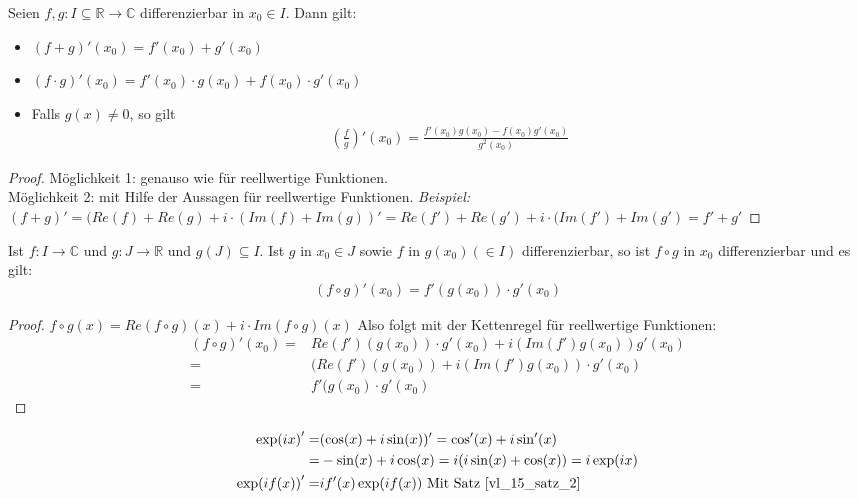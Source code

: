 \begin{Satz}{
	Seien $f,g : I \subseteq \mathbb{R} \rightarrow \mathbb{C}$ differenzierbar 
	in $x_0 \in I$. Dann gilt:
	\begin{itemize}
		\item $(f+g)'(x_0) = f'(x_0) + g'(x_0)$
		\item $(f\cdot g)'(x_0) = f'(x_0) \cdot g(x_0) + f(x_0) \cdot g'(x_0)$
		\item Falls $g(x) \neq 0$, so gilt
		\begin{align*}
			\left(\frac{f}{g}\right) '(x_0) = \frac{f'(x_0)g(x_0)-f(x_0)g'(x_0)}
			{g^2(x_0)}
		\end{align*}
	\end{itemize}
}\end{Satz}
\begin{proof}
	Möglichkeit 1: genauso wie für reellwertige Funktionen. \\
	Möglichkeit 2: mit Hilfe der Aussagen für reellwertige Funktionen.
	\textit{Beispiel: $(f+g)' = (Re(f)+Re(g) + i \cdot ( Im(f)+Im(g))' = Re(f') + 
	Re(g') + i \cdot (Im(f') + Im(g') = f' + g'$}
\end{proof}
\begin{Satz}{\label{vl_15_satz_2}
Ist $f : I \rightarrow \mathbb{C}$ und $g: J \rightarrow \mathbb{R}$ 
und $g(J) \subseteq I$. Ist $g$ in $x_0 \in J$ sowie $f$ in $g(x_0) (\in I)$ differenzierbar, so ist $f \circ g$ in $x_0$ differenzierbar und es gilt:
\begin{align*}
	(f\circ g)'(x_0) = f'(g(x_0)) \cdot g'(x_0)
\end{align*}
}\end{Satz}
\begin{proof}
	$f \circ g (x) = Re(f \circ g)(x) + i \cdot Im(f \circ g)(x)$
	Also folgt mit der Kettenregel für reellwertige Funktionen:
	\begin{align*}
		(f \circ g)'(x_0) = &  Re(f')(g(x_0))  \cdot g'(x_0) 
			+ i(Im(f')g(x_0)) g'(x_0) \\
			= & (Re(f')(g(x_0)) + i(Im(f')g(x_0)) \cdot g'(x_0) \\
			= & f'(g(x_0) \cdot g'(x_0)
	\end{align*}
\end{proof}

\begin{Beispiel}{
	\begin{align*}
		\exp(ix)' = & (\cos(x) + i\sin(x))' = \cos '(x) + i \sin ' (x) \\
		= & - \sin (x) + i \cos (x) 
		= i (i\sin (x) + \cos(x) ) = i \exp(ix) \\
		\exp(i f(x))' = & i f'(x) \exp(i f(x)) \text{ Mit Satz~\ref{vl_15_satz_2}}
	\end{align*}
}\end{Beispiel}

